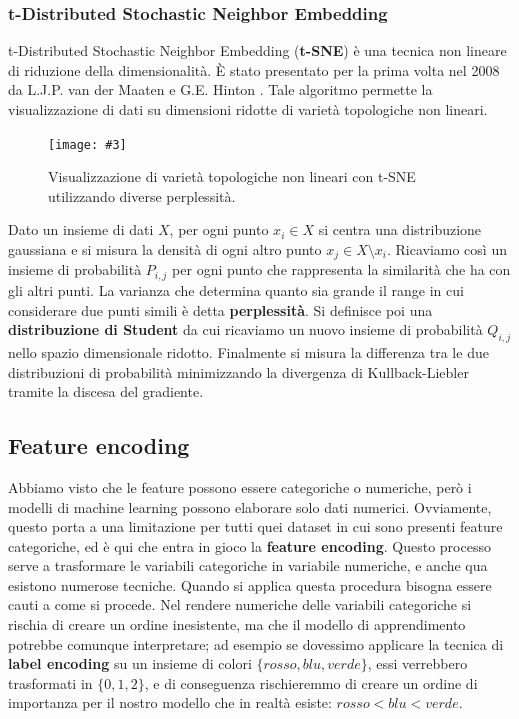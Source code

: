 \documentclass[12pt, twoside, letterpaper]{report}
\newcommand{\img}[4] {
	\begin{figure}
		\centering
		\texttt{[image: \#3]}\\
		\caption{#1}
		\label{#4}
	\end{figure}
}
\begin{document}
				\subsubsection{t-Distributed Stochastic Neighbor Embedding} t-Distributed Stochastic Neighbor Embedding (\textbf{t-SNE}) è una tecnica non lineare di riduzione della dimensionalità. È stato presentato per la prima volta nel 2008 da  L.J.P. van der Maaten e G.E. Hinton \cite{maaten_hinton}. Tale algoritmo permette la visualizzazione di dati su dimensioni ridotte di varietà topologiche non lineari.
					\img{Visualizzazione di varietà topologiche non lineari con t-SNE utilizzando diverse perplessità. \cite{sklearn}}{0.35}{tsne.png}{tsne}
				
					Dato un insieme di dati $X$, per ogni punto $x_i \in X$ si centra una distribuzione gaussiana e si misura la densità di ogni altro punto $x_j \in X \setminus x_i$. Ricaviamo così un insieme di probabilità $P_{i,j}$ per ogni punto che rappresenta la similarità che ha con gli altri punti. La varianza che determina quanto sia grande il range in cui considerare due punti simili è detta \textbf{perplessità}. Si definisce poi una \textbf{distribuzione di Student} da cui ricaviamo un nuovo insieme di probabilità $Q_{i,j}$ nello spazio dimensionale ridotto. Finalmente si misura la differenza tra le due distribuzioni di probabilità  minimizzando la divergenza di Kullback-Liebler tramite la discesa del gradiente. 
					
			\subsection{Feature encoding} 
				Abbiamo visto che le feature possono essere categoriche o numeriche, però i modelli di machine learning possono elaborare solo dati numerici. Ovviamente, questo porta a una limitazione per tutti quei dataset in cui sono presenti feature categoriche, ed è qui che entra in gioco la \textbf{feature encoding}. Questo processo serve a trasformare le variabili categoriche in variabile numeriche, e anche qua esistono numerose tecniche. Quando si applica questa procedura bisogna essere cauti a come si procede. Nel rendere numeriche delle variabili categoriche si rischia di creare un ordine inesistente, ma che il modello di apprendimento potrebbe comunque interpretare; ad esempio se dovessimo applicare la tecnica di \textbf{label encoding} su un insieme di colori $\{rosso, blu, verde\}$, essi verrebbero trasformati in $\{0,1,2\}$, e di conseguenza rischieremmo di creare un ordine di importanza per il nostro modello che in realtà esiste: $rosso < blu < verde$.
				
\end{document}

